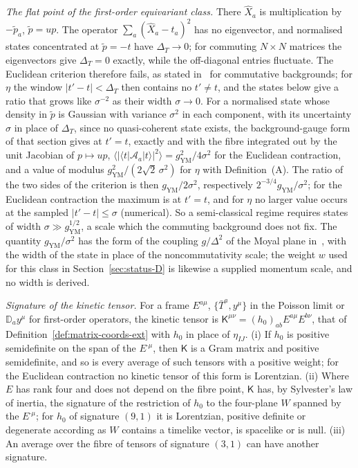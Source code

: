 \emph{The flat point of the first-order equivariant class.} There \(\hat X_a\) is multiplication by \(-\tilde p_a\), \(\tilde p=up\). The operator \(\sum_a(\hat X_a-t_a)^2\) has no eigenvector, and normalised states concentrated at \(\tilde p=-t\) have \(\Delta_T\to0\); for commuting \(N\times N\) matrices the eigenvectors give \(\Delta_T=0\) exactly, while the off-diagonal entries fluctuate. The Euclidean criterion therefore fails, as stated in~\cite{Steinacker2026Weak} for commutative backgrounds; for \(\eta\) the window \(|t'-t|<\Delta_T\) then contains no \(t'\neq t\), and the states below give a ratio that grows like \(\sigma^{-2}\) as their width \(\sigma\to0\). For a normalised state whose density in \(\tilde p\) is Gaussian with variance \(\sigma^2\) in each component, with its uncertainty \(\sigma\) in place of \(\Delta_T\), since no quasi-coherent state exists, the background-gauge form of that section gives at \(t'=t\), exactly and with the fibre integrated out by the unit Jacobian of \(p\mapsto up\), \(\langle|\langle t|\mathcal A_a|t\rangle|^2\rangle=g_{\mathrm{YM}}^2/4\sigma^2\) for the Euclidean contraction, and a value of modulus \(g_{\mathrm{YM}}^2/(2\sqrt2\,\sigma^2)\) for \(\eta\) with Definition~(A). The ratio of the two sides of the criterion is then \(g_{\mathrm{YM}}/2\sigma^2\), respectively \(2^{-3/4}g_{\mathrm{YM}}/\sigma^2\); for the Euclidean contraction the maximum is at \(t'=t\), and for \(\eta\) no larger value occurs at the sampled \(|t'-t|\le\sigma\) (numerical). So a semi-classical regime requires states of width \(\sigma\gg g_{\mathrm{YM}}^{1/2}\), a scale which the commuting background does not fix. The quantity \(g_{\mathrm{YM}}/\sigma^2\) has the form of the coupling \(g/\Delta^2\) of the Moyal plane in~\cite{Steinacker2026Weak}, with the width of the state in place of the noncommutativity scale; the weight \(w\) used for this class in Section~\ref{sec:status-D} is likewise a supplied momentum scale, and no width is derived.

\emph{Signature of the kinetic tensor.} For a frame \(E^{a\mu}\), \(\{\bar T^a,y^\mu\}\) in the Poisson limit or \(\mathbb D_ay^\mu\) for first-order operators, the kinetic tensor is \(\mathsf K^{\mu\nu}=(h_0)_{ab}E^{a\mu}E^{b\nu}\), that of Definition~\ref{def:matrix-coords-ext} with \(h_0\) in place of \(\eta_{IJ}\). (i) If \(h_0\) is positive semidefinite on the span of the \(E^{\cdot\mu}\), then \(\mathsf K\) is a Gram matrix and positive semidefinite, and so is every average of such tensors with a positive weight; for the Euclidean contraction no kinetic tensor of this form is Lorentzian. (ii) Where \(E\) has rank four and does not depend on the fibre point, \(\mathsf K\) has, by Sylvester's law of inertia, the signature of the restriction of \(h_0\) to the four-plane \(W\) spanned by the \(E^{\cdot\mu}\); for \(h_0\) of signature \((9,1)\) it is Lorentzian, positive definite or degenerate according as \(W\) contains a timelike vector, is spacelike or is null. (iii) An average over the fibre of tensors of signature \((3,1)\) can have another signature.

